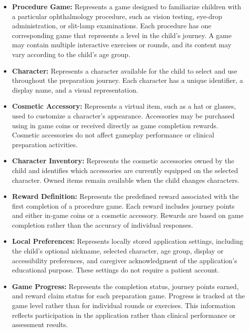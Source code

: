 \documentclass[12pt]{article}
\begin{document}
\begin{itemize}

    \item \textbf{Procedure Game:}
    Represents a game designed to familiarize children
    with a particular ophthalmology procedure, such as
    vision testing, eye-drop administration, or slit-lamp
    examinations. Each procedure has one corresponding
    game that represents a level in the child's journey.
    A game may contain multiple interactive exercises
    or rounds, and its content may vary according to
    the child's age group.

    \item \textbf{Character:}
    Represents a character available for the child to
    select and use throughout the preparation journey.
    Each character has a unique identifier, a display
    name, and a visual representation.

    \item \textbf{Cosmetic Accessory:}
    Represents a virtual item, such as a hat or glasses,
    used to customize a character's appearance.
    Accessories may be purchased using in game coins
    or received directly as game completion rewards.
    Cosmetic accessories do not affect gameplay
    performance or clinical preparation activities.

    \item \textbf{Character Inventory:}
    Represents the cosmetic accessories owned by the
    child and identifies which accessories are currently
    equipped on the selected character. Owned items
    remain available when the child changes characters.

    \item \textbf{Reward Definition:}
    Represents the predefined reward associated with
    the first completion of a procedure game.
    Each reward includes journey points and either
    in-game coins or a cosmetic accessory.
    Rewards are based on game completion rather
    than the accuracy of individual responses.

    \item \textbf{Local Preferences:}
    Represents locally stored application settings,
    including the child's optional nickname, selected
    character, age group, display or accessibility
    preferences, and caregiver acknowledgment of
    the application's educational purpose.
    These settings do not require a patient account.

    \item \textbf{Game Progress:}
    Represents the completion status, journey points
    earned, and reward claim status for each preparation
    game. Progress is tracked at the game level rather
    than for individual rounds or exercises.
    This information reflects participation in the
    application rather than clinical performance
    or assessment results.


\end{itemize}
\end{document}
